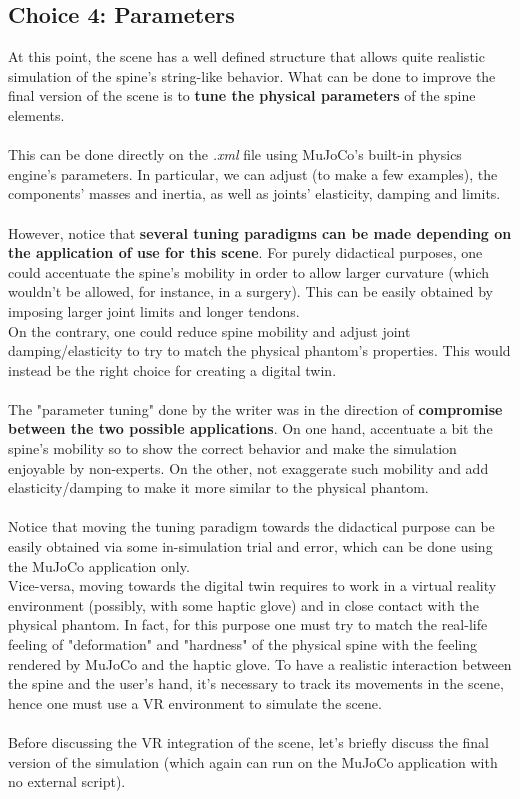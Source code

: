\documentclass[a4paper, 12pt]{article}
\begin{document}
\subsection{Choice 4: Parameters}
At this point, the scene has a well defined structure that allows quite realistic simulation of the spine's string-like behavior. What can be done to improve the final version of the scene is to \textbf{tune the physical parameters} of the spine elements.
\\\\This can be done directly on the \textit{.xml} file using MuJoCo's built-in physics engine's parameters.
In particular, we can adjust (to make a few examples), the components' masses and inertia, as well as joints' elasticity, damping and limits.
\\\\
However, notice that \textbf{several tuning paradigms can be made depending on the application of use for this scene}. For purely didactical purposes, one could accentuate the spine's mobility in order to allow larger curvature (which wouldn't be allowed, for instance, in a surgery). This can be easily obtained by imposing larger joint limits and longer tendons.
\\On the contrary, one could reduce spine mobility and adjust joint damping/elasticity to try to match the physical phantom's properties. This would instead be the right choice for creating a digital twin. 
\\\\The "parameter tuning" done by the writer was in the direction of \textbf{compromise between the two possible applications}. On one hand, accentuate a bit the spine's mobility so to show the correct behavior and make the simulation enjoyable by non-experts. On the other, not exaggerate such mobility and add elasticity/damping to make it more similar to the physical phantom.
\\\\ 
Notice that moving the tuning paradigm towards the didactical purpose can be easily obtained via some in-simulation trial and error, which can be done using the MuJoCo application only. \\Vice-versa, moving towards the digital twin requires to work in a virtual reality environment (possibly, with some haptic glove) and in close contact with the physical phantom. In fact, for this purpose one must try to match the real-life feeling of "deformation" and "hardness" of the physical spine with the feeling rendered by MuJoCo and the haptic glove. To have a realistic interaction between the spine and the user's hand, it's necessary to track its movements in the scene, hence one must use a VR environment to simulate the scene.
\\\\
Before discussing the VR integration of the scene, let's briefly discuss the final version of the simulation (which again can run on the MuJoCo application with no external script).
\end{document}
